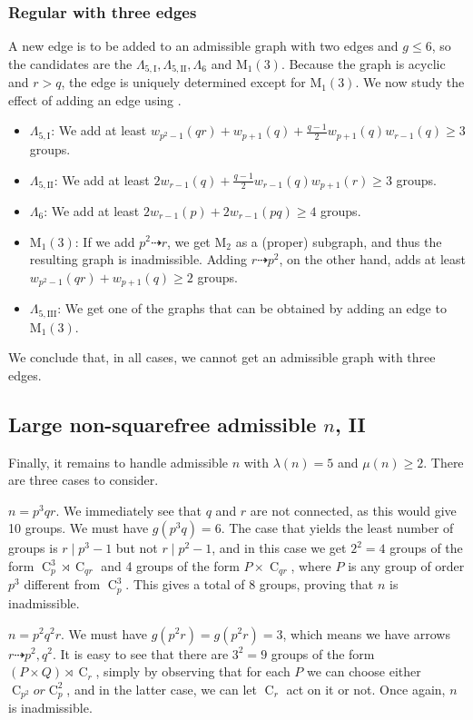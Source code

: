 \documentclass{article}
\newcommand{\cyc}[1]{\operatorname{C}_{#1}}
\newcommand{\qlame}{\Lambda_{5,\text{I}}}
\newcommand{\qlamz}{\Lambda_{5,\text{II}}}
\newcommand{\qlamd}{\Lambda_{5,\text{III}}}
\newcommand{\m}[1]{\text{M}_{#1}}
\newcommand{\hthref}[1]{\hyperref[#1]{\thref{#1}}}
\theoremstyle{plain}
\theoremstyle{definition}
\begin{document}
\subsubsection*{Regular  with three edges}
A new edge is to be added to an admissible graph with two edges and $g \le 6$, so the candidates are the $\qlame, \qlamz, \Lambda_6$ and $\m1(3)$. Because the graph is acyclic and $r > q$, the edge is uniquely determined except for $\m1(3)$. We now study the effect of adding an edge using \hthref{euppqr}.
\begin{itemize}
	\item $\qlame$: We add at least $w_{p^2 - 1}(qr) + w_{p + 1}(q) + \frac{q - 1}{2}w_{p + 1}(q)w_{r - 1}(q) \ge 3$ groups.
	\item $\qlamz$: We add at least $2w_{r - 1}(q) + \frac{q - 1}{2} w_{r - 1}(q)w_{p + 1}(r) \ge 3$ groups.
	\item $\Lambda_6$: We add at least $2w_{r - 1}(p) + 2w_{r - 1}(pq) \ge 4$ groups.
	\item $\m1(3)$: If we add $p^2 \dashrightarrow r$, we get $\m{2}$ as a (proper) subgraph, and thus the resulting graph is inadmissible. Adding $r \dashrightarrow p^2$, on the other hand, adds at least $w_{p^2 - 1}(qr) + w_{p + 1}(q) \ge 2$ groups.
	\item $\qlamd$: We get one of the graphs that can be obtained by adding an edge to $\m1(3)$.
\end{itemize}
We conclude that, in all cases, we cannot get an admissible graph with three edges.


\subsection{Large non-squarefree admissible $n$, II} 
Finally, it remains to handle admissible $n$ with $\lambda(n) = 5$ and $\mu(n) \ge 2$. There are three cases to consider.

 $n = p^3 q r$.
We immediately see that $q$ and $r$ are not connected, as this would give 10 groups. We must have $g(p^3 q) = 6$. The case that yields the least number of groups is $r \mid p^3 - 1$ but not $r \mid p^2 - 1$, and in this case we get $2^2 = 4$ groups of the form $\cyc{p}^3 \rtimes \cyc{qr}$ and 4 groups of the form $P \times \cyc{qr}$, where $P$ is any group of order $p^3$ different from $\cyc{p}^3$. This gives a total of 8 groups, proving that $n$ is inadmissible.

 $n = p^2 q^2 r$.
We must have $g(p^2 r) = g(p^2 r) = 3$, which means we have arrows $r \dashrightarrow p^2, q^2$. It is easy to see that there are $3^2 = 9$ groups of the form $(P \times Q) \rtimes \cyc{r}$, simply by observing that for each $P$ we can choose either $\cyc{p^2} or \cyc{p}^2$, and in the latter case, we can let $\cyc{r}$ act on it or not. Once again, $n$ is inadmissible.
 
\end{document}
